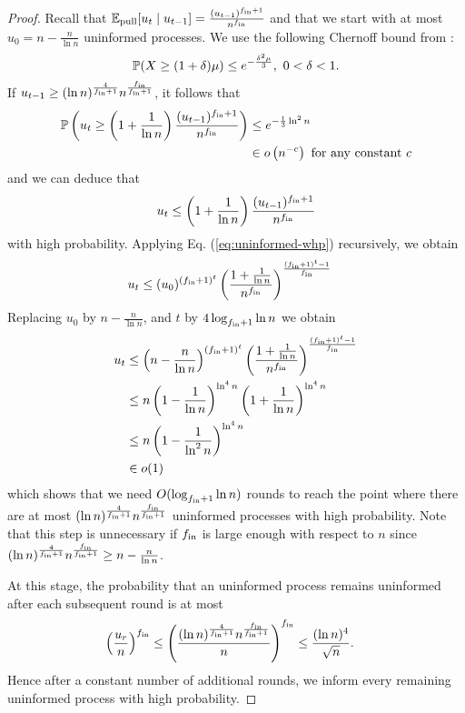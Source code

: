 \begin{proof}
    Recall that $\E_{\text{pull}}[\uninformed{t}\mid\uninformed{t-1}] =  \frac{(\uninformed{t-1})^{\fanin+1}}{n^{\fanin}}$ and that we start with at most $u_0 = n - \frac{n}{\ln n}$ uninformed processes. We use the following Chernoff bound from \cite{mitzenmacher2005probability}: 
    \[ \P(X \geq (1 + \delta) \mu) \leq e^{-\frac{\delta^2 \mu}{3}},\ 0 < \delta < 1. \]
If $u_{t-1} \geq (\ln n)^{\frac{4}{\fanin+1}}n^\frac{\fanin}{\fanin+1}$, it follows that
    \begin{align*}
      \P\left(u_t \geq \left(1 + \frac{1}{\ln n}\right) \frac{(\uninformed{t-1})^{\fanin+1}}{n^{\fanin}}\right) 
        & \leq  e^{- \frac{1}{3} \ln^2 n} \\ & \in o\left(n^{-c}\right) \text{ for any constant $c$}
    \end{align*}
and we can deduce that
    \begin{equation}
      \label{eq:uninformed-whp}
      \uninformed{t} \leq \left(1 + \frac{1}{\ln n}\right) \frac{(\uninformed{t-1})^{\fanin+1}}{n^{\fanin}}
    \end{equation}
    with high probability. Applying Eq. (\ref{eq:uninformed-whp}) recursively, we obtain
    \begin{align}
      \uninformed{t} & \leq (\uninformed{0})^{{(\fanin+1)^t}}\left(\frac{1 + \frac{1}{\ln n}}{n^{\fanin}}\right)^\frac{(\fanin+1)^t-1}{\fanin} 
    \end{align}
Replacing $u_0$ by $n - \frac{n }{\ln n}$, and $t$ by $4 \log_{\fanin+1}\ln n$ we obtain 
\begin{equation}
  \begin{split}
   \uninformed{t} & \leq \left(n-\frac{n}{\ln n}\right)^{{(\fanin+1)^t}}\left(\frac{1 + \frac{1}{\ln n}}{n^{\fanin}}\right)^\frac{(\fanin+1)^t-1}{\fanin} \\ & \leq n \left(1-\frac{1}{\ln n}\right)^{\ln^4 n} \left(1+\frac{1}{\ln n}\right)^{\ln^4 n} \\ & \leq n \left(1-\frac{1}{\ln^2 n}\right)^{\ln^4 n} \\ & \in o(1)
 \end{split}
\end{equation}
which shows that we need $O(\log_{\fanin+1} \ln n)$ rounds to reach the point where there are at most $(\ln n)^{\frac{4}{\fanin+1}}n^\frac{\fanin}{\fanin+1}$ uninformed processes with high probability. Note that this step is unnecessary if $\fanin$ is large enough with respect to $n$ since $(\ln n)^{\frac{4}{\fanin+1}}n^\frac{\fanin}{\fanin+1} \geq n-\frac{n}{\ln n}$.

At this stage, the probability that an uninformed process remains uninformed after each subsequent round is at most 
    \begin{align}
      \label{eq:21}
      \left(\frac{\uninformed{r}}{n}\right)^{\fanin} & \leq \left(\frac{(\ln n)^{\frac{4}{\fanin+1}}n^\frac{\fanin}{\fanin+1}}{n}\right)^{\fanin} \leq \frac{(\ln n)^4}{\sqrt{n}}.
    \end{align}
    Hence after a constant number of additional rounds, we inform every remaining uninformed process with high probability. 

  \end{proof}

